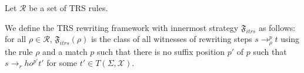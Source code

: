 \begin{definition}
  Let $\mathcal{R}$ be a set of TRS rules. 

  We define the TRS rewriting framework with innermost strategy $\mathfrak{F}_{itrs}$ as follows: for all $\rho \mathop{\in} \mathcal{R}$, $\mathfrak{F}_{itrs}(\rho)$ is the class of all witnesses of rewriting steps $s \mathop{\to} _\rho^p t$ using the rule $\rho$ and a match $p$ such that there is no suffix position $p'$ of $p$ such that $s \mathop{\to} _rho^{p'} t'$ for some $t' \mathop{\in} T(\Sigma,\mathcal{X})$.
\end{definition}



